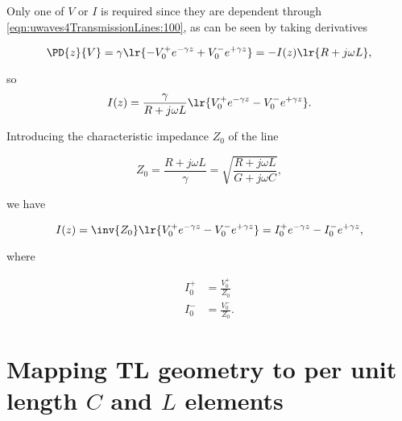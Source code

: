 Only one of \( V \) or \( I \) is required since they are dependent through \cref{eqn:uwaves4TransmissionLines:100}, as can be seen by taking derivatives

\begin{dmath}\label{eqn:uwaves4TransmissionLines:220}
\PD{z}{V} 
= \gamma \lr{ -V_0^{+} e^{-\gamma z} + V_0^{-} e^{+\gamma z} }
= 
-I(z) \lr{ R + j \omega L },
\end{dmath}

so
\begin{equation}\label{eqn:uwaves4TransmissionLines:240}
I(z) 
=
\frac{\gamma}{ R + j \omega L } \lr{ V_0^{+} e^{-\gamma z} - V_0^{-} e^{+\gamma z} }.
\end{equation}

Introducing the characteristic impedance \( Z_0 \) of the line

\begin{dmath}\label{eqn:uwaves4TransmissionLines:260}
Z_0 
= \frac{R + j \omega L}{\gamma} 
= \sqrt{ \frac{R + j \omega L}{G + j \omega C} },
\end{dmath}

we have

\begin{dmath}\label{eqn:uwaves4TransmissionLines:280}
I(z) 
=
\inv{Z_0} \lr{ V_0^{+} e^{-\gamma z} - V_0^{-} e^{+\gamma z} }
=
I_0^{+} e^{-\gamma z} - I_0^{-} e^{+\gamma z},
\end{dmath}

where

\begin{equation}\label{eqn:uwaves4TransmissionLines:300}
\begin{aligned}
I_0^{+} &= \frac{V_0^{+}}{Z_0} \\
I_0^{-} &= \frac{V_0^{-}}{Z_0}.
\end{aligned}
\end{equation}

\section{Mapping TL geometry to per unit length \( C \) and \( L \) elements}

